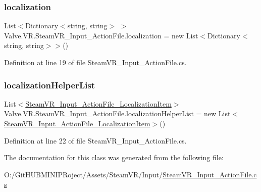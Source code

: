 \mbox{\label{class_valve_1_1_v_r_1_1_steam_v_r___input___action_file_af3d52acf4347b019cce1a503c994023c}} 
\subsubsection{\texorpdfstring{localization}{localization}}
{\footnotesize\ttfamily List$<$Dictionary$<$string, string$>$ $>$ Valve.\+V\+R.\+Steam\+V\+R\+\_\+\+Input\+\_\+\+Action\+File.\+localization = new List$<$Dictionary$<$string, string$>$$>$()}



Definition at line 19 of file Steam\+V\+R\+\_\+\+Input\+\_\+\+Action\+File.\+cs.

\mbox{\label{class_valve_1_1_v_r_1_1_steam_v_r___input___action_file_a99c45fb1db534b6504c7b2f884a306da}} 
\subsubsection{\texorpdfstring{localizationHelperList}{localizationHelperList}}
{\footnotesize\ttfamily List$<$\mbox{\hyperlink{class_valve_1_1_v_r_1_1_steam_v_r___input___action_file___localization_item}{Steam\+V\+R\+\_\+\+Input\+\_\+\+Action\+File\+\_\+\+Localization\+Item}}$>$ Valve.\+V\+R.\+Steam\+V\+R\+\_\+\+Input\+\_\+\+Action\+File.\+localization\+Helper\+List = new List$<$\mbox{\hyperlink{class_valve_1_1_v_r_1_1_steam_v_r___input___action_file___localization_item}{Steam\+V\+R\+\_\+\+Input\+\_\+\+Action\+File\+\_\+\+Localization\+Item}}$>$()}



Definition at line 22 of file Steam\+V\+R\+\_\+\+Input\+\_\+\+Action\+File.\+cs.



The documentation for this class was generated from the following file\+:\begin{DoxyCompactItemize}
\item 
O\+:/\+Git\+H\+U\+B\+M\+I\+N\+I\+P\+Roject/\+Assets/\+Steam\+V\+R/\+Input/\mbox{\hyperlink{_steam_v_r___input___action_file_8cs}{Steam\+V\+R\+\_\+\+Input\+\_\+\+Action\+File.\+cs}}\end{DoxyCompactItemize}
